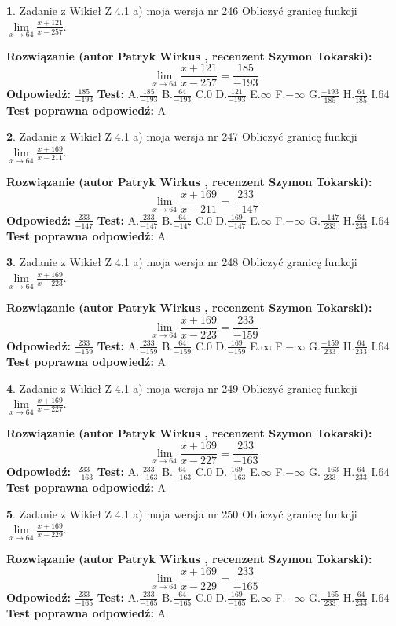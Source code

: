 \documentclass[12pt, a4paper]{article}
\theoremstyle{definition} %
\newtheorem{zad}{}
\newcommand{\zadStart}[1]{\begin{zad}#1\newline}
\newcommand{\zadStop}{\end{zad}}
\newcommand{\rozwStart}[2]{\noindent \textbf{Rozwiązanie (autor #1 , recenzent #2): }\newline}
\newcommand{\rozwStop}{\newline}
\newcommand{\odpStart}{\noindent \textbf{Odpowiedź:}\newline}
\newcommand{\odpStop}{\newline}
\newcommand{\testStart}{\noindent \textbf{Test:}\newline}
\newcommand{\testStop}{\newline}
\newcommand{\kluczStart}{\noindent \textbf{Test poprawna odpowiedź:}\newline}
\newcommand{\kluczStop}{\newline}
\begin{document}
\zadStart{Zadanie z Wikieł Z 4.1 a) moja wersja nr 246}
Obliczyć granicę funkcji $\lim\limits_{x\to64}\frac{x+121}{x-257}$.
\zadStop
\rozwStart{Patryk Wirkus}{Szymon Tokarski}
$$\lim\limits_{x\to64}\frac{x+121}{x-257} = \frac{185}{-193}$$
\rozwStop
\odpStart
$\frac{185}{-193}$
\odpStop
\testStart
A.$\frac{185}{-193}$
B.$\frac{64}{-193}$
C.$0$
D.$\frac{121}{-193}$
E.$\infty$
F.$-\infty$
G.$\frac{-193}{185}$
H.$\frac{64}{185}$
I.$64$
\testStop
\kluczStart
A
\kluczStop



\zadStart{Zadanie z Wikieł Z 4.1 a) moja wersja nr 247}
Obliczyć granicę funkcji $\lim\limits_{x\to64}\frac{x+169}{x-211}$.
\zadStop
\rozwStart{Patryk Wirkus}{Szymon Tokarski}
$$\lim\limits_{x\to64}\frac{x+169}{x-211} = \frac{233}{-147}$$
\rozwStop
\odpStart
$\frac{233}{-147}$
\odpStop
\testStart
A.$\frac{233}{-147}$
B.$\frac{64}{-147}$
C.$0$
D.$\frac{169}{-147}$
E.$\infty$
F.$-\infty$
G.$\frac{-147}{233}$
H.$\frac{64}{233}$
I.$64$
\testStop
\kluczStart
A
\kluczStop



\zadStart{Zadanie z Wikieł Z 4.1 a) moja wersja nr 248}
Obliczyć granicę funkcji $\lim\limits_{x\to64}\frac{x+169}{x-223}$.
\zadStop
\rozwStart{Patryk Wirkus}{Szymon Tokarski}
$$\lim\limits_{x\to64}\frac{x+169}{x-223} = \frac{233}{-159}$$
\rozwStop
\odpStart
$\frac{233}{-159}$
\odpStop
\testStart
A.$\frac{233}{-159}$
B.$\frac{64}{-159}$
C.$0$
D.$\frac{169}{-159}$
E.$\infty$
F.$-\infty$
G.$\frac{-159}{233}$
H.$\frac{64}{233}$
I.$64$
\testStop
\kluczStart
A
\kluczStop



\zadStart{Zadanie z Wikieł Z 4.1 a) moja wersja nr 249}
Obliczyć granicę funkcji $\lim\limits_{x\to64}\frac{x+169}{x-227}$.
\zadStop
\rozwStart{Patryk Wirkus}{Szymon Tokarski}
$$\lim\limits_{x\to64}\frac{x+169}{x-227} = \frac{233}{-163}$$
\rozwStop
\odpStart
$\frac{233}{-163}$
\odpStop
\testStart
A.$\frac{233}{-163}$
B.$\frac{64}{-163}$
C.$0$
D.$\frac{169}{-163}$
E.$\infty$
F.$-\infty$
G.$\frac{-163}{233}$
H.$\frac{64}{233}$
I.$64$
\testStop
\kluczStart
A
\kluczStop



\zadStart{Zadanie z Wikieł Z 4.1 a) moja wersja nr 250}
Obliczyć granicę funkcji $\lim\limits_{x\to64}\frac{x+169}{x-229}$.
\zadStop
\rozwStart{Patryk Wirkus}{Szymon Tokarski}
$$\lim\limits_{x\to64}\frac{x+169}{x-229} = \frac{233}{-165}$$
\rozwStop
\odpStart
$\frac{233}{-165}$
\odpStop
\testStart
A.$\frac{233}{-165}$
B.$\frac{64}{-165}$
C.$0$
D.$\frac{169}{-165}$
E.$\infty$
F.$-\infty$
G.$\frac{-165}{233}$
H.$\frac{64}{233}$
I.$64$
\testStop
\kluczStart
A
\kluczStop
\end{document}
